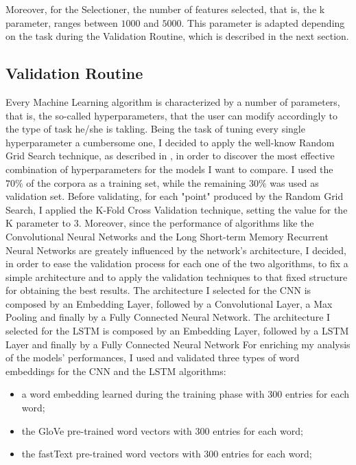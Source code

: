 \documentclass[11pt,twocolumn]{article}
\begin{document}
            \noindent
            Moreover, for the Selectioner, the number of features selected, that is, the k parameter,
            ranges between $1000$ and $5000$. This parameter is adapted depending on the task during the
            Validation Routine, which is described in the next section.

        \subsection{Validation Routine} %
        \label{sub:validation_routine}
            Every Machine Learning algorithm is characterized by a number of parameters, that is, the
            so-called hyperparameters, that the user can modify accordingly to the type of task he/she is
            takling. Being the task of tuning every single hyperparameter a cumbersome one, I decided to
            apply the well-know Random Grid Search technique, as described in \cite{random_grid_search}, in
            order to discover the most effective combination of hyperparameters for the models I want to
            compare. I used the $70\%$ of the corpora as a training set, while the remaining $30\%$ was used as
            validation set. Before validating, for each "point" produced by the Random Grid Search, I
            applied the K-Fold Cross Validation technique, setting the value for the K parameter to $3$.
            Moreover, since the performance of algorithms like the Convolutional Neural Networks and the
            Long Short-term Memory Recurrent Neural Networks are greately influenced by the network's
            architecture, I decided, in order to ease the validation process for each one of the two
            algorithms, to fix a simple architecture and to apply the validation techniques to that fixed
            structure for obtaining the best results. The architecture I selected for the CNN is composed
            by an Embedding Layer, followed by a Convolutional Layer, a Max Pooling and finally by a Fully
            Connected Neural Network. The architecture I selected for the LSTM is composed by an Embedding
            Layer, followed by a LSTM Layer and finally by a Fully Connected Neural Network For enriching
            my analysis of the models' performances, I used and validated three types of word embeddings
            for the CNN and the LSTM algorithms:

            \begin{itemize}
                \item a word embedding learned during the training phase with $300$ entries for each word;
                \item the GloVe \cite{glove} pre-trained word vectors with $300$ entries for each word;
                \item the fastText \cite{fasttext} pre-trained word vectors with $300$ entries for each
                word;
            \end{itemize}
\end{document}
